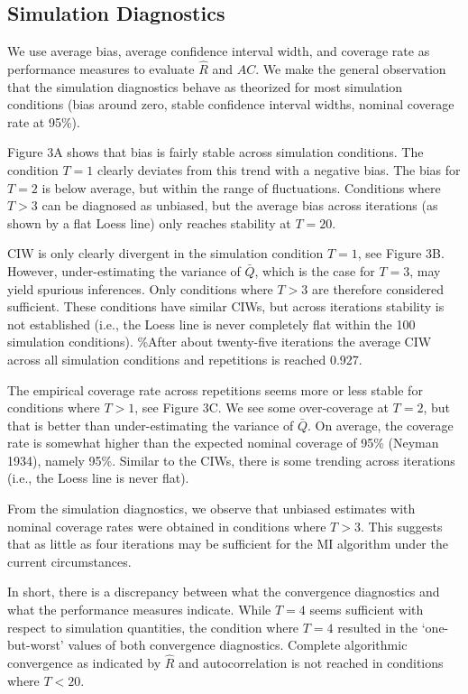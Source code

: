 \documentclass[
  Royal, times, sageapa]{sagej}
\begin{document}
\hypertarget{simulation-diagnostics}{%
\subsection{Simulation Diagnostics}\label{simulation-diagnostics}}

We use average bias, average confidence interval width, and coverage
rate as performance measures to evaluate \(\widehat{R}\) and \(AC\). We
make the general observation that the simulation diagnostics behave as
theorized for most simulation conditions (bias around zero, stable
confidence interval widths, nominal coverage rate at 95\%).

Figure 3A shows that bias is fairly stable across simulation conditions.
The condition \(T=1\) clearly deviates from this trend with a negative
bias. The bias for \(T=2\) is below average, but within the range of
fluctuations. Conditions where \(T>3\) can be diagnosed as unbiased, but
the average bias across iterations (as shown by a flat Loess line) only
reaches stability at \(T=20\).

CIW is only clearly divergent in the simulation condition \(T=1\), see
Figure 3B. However, under-estimating the variance of \(\bar{Q}\), which
is the case for \(T=3\), may yield spurious inferences. Only conditions
where \(T>3\) are therefore considered sufficient. These conditions have
similar CIWs, but across iterations stability is not established (i.e.,
the Loess line is never completely flat within the 100 simulation
conditions). \%After about twenty-five iterations the average CIW across
all simulation conditions and repetitions is reached 0.927.

The empirical coverage rate across repetitions seems more or less stable
for conditions where \(T>1\), see Figure 3C. We see some over-coverage
at \(T=2\), but that is better than under-estimating the variance of
\(\bar{Q}\). On average, the coverage rate is somewhat higher than the
expected nominal coverage of 95\% (Neyman 1934), namely 95\%. Similar to
the CIWs, there is some trending across iterations (i.e., the Loess line
is never flat).

From the simulation diagnostics, we observe that unbiased estimates with
nominal coverage rates were obtained in conditions where \(T>3\). This
suggests that as little as four iterations may be sufficient for the MI
algorithm under the current circumstances.

In short, there is a discrepancy between what the convergence
diagnostics and what the performance measures indicate. While \(T=4\)
seems sufficient with respect to simulation quantities, the condition
where \(T=4\) resulted in the `one-but-worst' values of both convergence
diagnostics. Complete algorithmic convergence as indicated by
\(\widehat{R}\) and autocorrelation is not reached in conditions where
\(T<20\).
\end{document}
